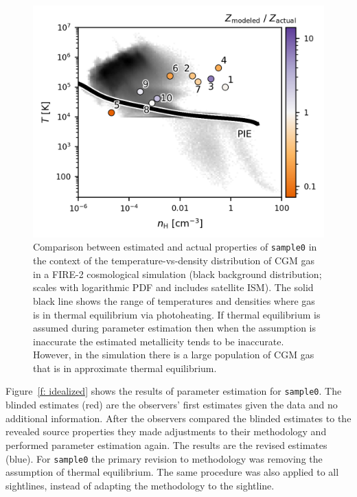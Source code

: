\documentclass[fleqn,usenatbib]{mnras}
\begin{document}
\begin{figure}
    \centering
    \includegraphics[width=\columnwidth]{figures/sample0/phase_space.png}
    \caption{
    Comparison between estimated and actual properties of \texttt{sample0} in the context of the temperature-vs-density distribution of CGM gas in a FIRE-2 cosmological simulation (black background distribution; scales with logarithmic PDF and includes satellite ISM).
    The solid black line shows the range of temperatures and densities where gas is in thermal equilibrium via photoheating.
    If thermal equilibrium is assumed during parameter estimation then when the assumption is inaccurate the estimated metallicity tends to be inaccurate.
    However, in the simulation there is a large population of CGM gas that is in approximate thermal equilibrium.
    }
    \label{f: idealized explanation}
\end{figure}

Figure~\ref{f: idealized} shows the results of parameter estimation for \texttt{sample0}.
The blinded estimates (red)  are the observers' first estimates given the data and no additional information.
After the observers compared the blinded estimates to the revealed source properties they made adjustments to their methodology and performed parameter estimation again.
The results are the revised estimates (blue).
For \texttt{sample0} the primary revision to methodology was removing the assumption of thermal equilibrium.
The same procedure was also applied to all sightlines, instead of adapting the methodology to the sightline.
\end{document}

